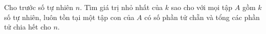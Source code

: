 \ifshowproblem
\begin{problem}\label{example:IRN-2015-TST1-P4}
	Cho trước số tự nhiên \( n \). Tìm giá trị nhỏ nhất của \( k \) sao cho với mọi tập \( A \) gồm \( k \) số tự nhiên,
	luôn tồn tại một tập con của \( A \) có số phần tử chẵn và tổng các phần tử chia hết cho \( n \).
\end{problem}
\fi

\footnotemark
{}
\fi